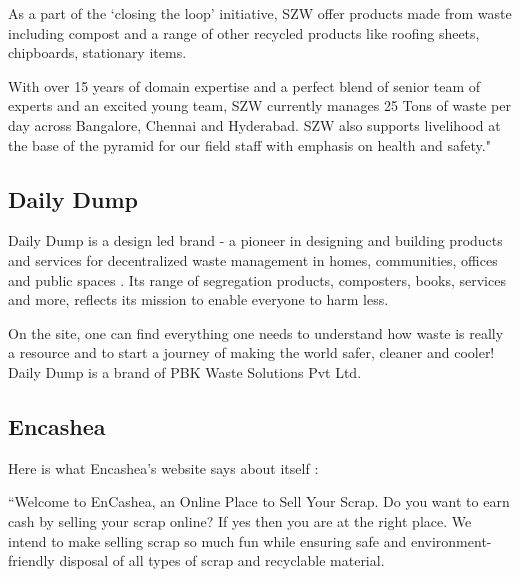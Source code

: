 \documentclass[10pt]{article}
\begin{document}
As a part of the ‘closing the loop’ initiative, SZW offer products made from waste including compost and a range of other recycled products like roofing sheets, chipboards, stationary items.

With over 15 years of domain expertise and a perfect blend of senior team of experts and an excited young team, SZW currently manages 25 Tons of waste per day across Bangalore, Chennai and Hyderabad. SZW also supports livelihood at the base of the pyramid for our field staff with emphasis on health and safety."

\subsection{Daily Dump}

Daily Dump is a design led brand - a pioneer in designing and building products and services for decentralized waste management in homes, communities, offices and public spaces \citep{DailyDump:about}. Its range of segregation products, composters, books, services and more, reflects its mission to enable everyone to harm less.

On the site, one can find everything one needs to understand how waste is really a resource and to start a journey of making the world safer, cleaner and cooler! 
Daily Dump is a brand of PBK Waste Solutions Pvt Ltd.

\subsection{Encashea}

Here is what Encashea's website says about itself \citep{Encashea:about}:

``Welcome to EnCashea, an Online Place to Sell Your Scrap. Do you want to earn cash by selling your scrap online? If yes then you are at the right place. We intend to make selling scrap so much fun while ensuring safe and environment-friendly disposal of all types of scrap and recyclable material.
\end{document}

